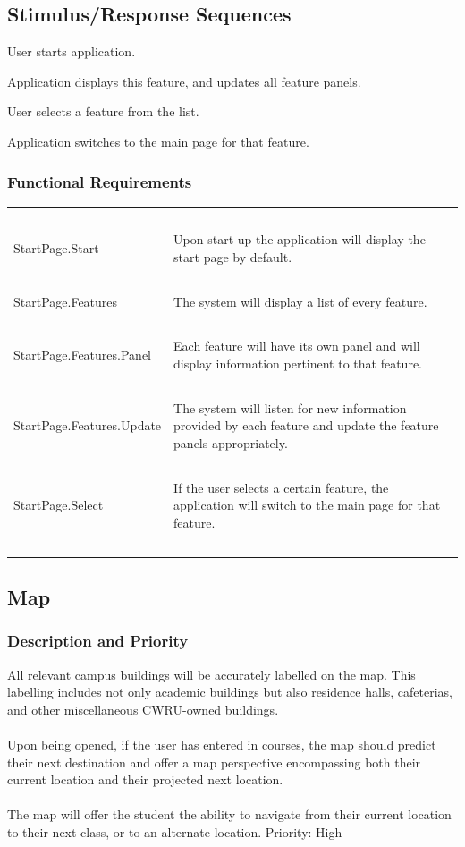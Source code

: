 \documentclass[pdftex,12pt,letter]{article}
\begin{document}
\subsection{Stimulus/Response Sequences}
\begin{description}\itemsep1pt
\item[Stimulus:] User starts application.
\item[Response:] Application displays this feature, and updates all feature panels.
\item[Stimulus:] User selects a feature from the list.
\item[Response:] Application switches to the main page for that feature.
\end{description}
\subsubsection{Functional Requirements}
\begin{table}[!h]
\begin{tabularx}{\textwidth }[t]{|l Y|}
\hline
~&~\\
StartPage.Start & Upon start-up the application will display the start page by default.\\ 
~&~\\
StartPage.Features & The system will display a list of every feature.\\
~&~\\
StartPage.Features.Panel & Each feature will have its own panel and will display information pertinent to that feature. \\
~&~\\
StartPage.Features.Update & The system will listen for new information provided by each feature and update the feature panels appropriately.\\
~&~\\
StartPage.Select & If the user selects a certain feature, the application will switch to the main page for that feature.\\
~&~\\
\hline
\end{tabularx}
\end{table}
\subsection{Map}
\subsubsection{Description and Priority}
All relevant campus buildings will be accurately labelled on the map. This labelling includes not only academic buildings but also residence halls, cafeterias, and other miscellaneous CWRU-owned buildings.\\\\
Upon being opened, if the user has entered in courses, the map should predict their next destination and offer a map perspective encompassing both their current location and their projected next location.\\\\
The map will offer the student the ability to navigate from their current location to their next class, or to an alternate location. Priority: High
\end{document}
